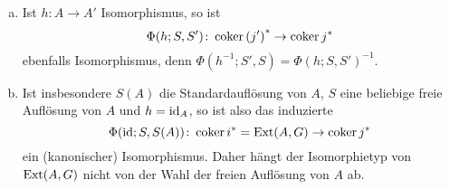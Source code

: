 \begin{kommentar}
  \begin{enumerate}[(a)]
    \item 
      Ist $h\colon A \to A'$ Isomorphismus, so ist
      \begin{equation*}
        \Phi(h;S,S')\colon \operatorname{coker} {(j')}^* \to \operatorname{coker} j^*
      \end{equation*}
      ebenfalls Isomorphismus, denn $\Phi(h^{-1};S',S) = {\Phi(h;S,S')}^{-1}$.
    \item
      Ist insbesondere $S(A)$ die Standardauflösung von $A$, $S$ eine beliebige freie Auflösung von $A$ und $h = \operatorname{id}_A$, so ist also das induzierte
      \begin{equation*}
        \Phi(\operatorname{id};S,S(A))\colon \operatorname{coker} i^* = \mathrm{Ext}(A,G) \to \operatorname{coker} j^*
      \end{equation*}
      ein (kanonischer) Isomorphismus.
      Daher hängt der Isomorphietyp von $\mathrm{Ext}(A,G)$ nicht von der Wahl der freien Auflösung von $A$ ab.
  \end{enumerate}
\end{kommentar}
